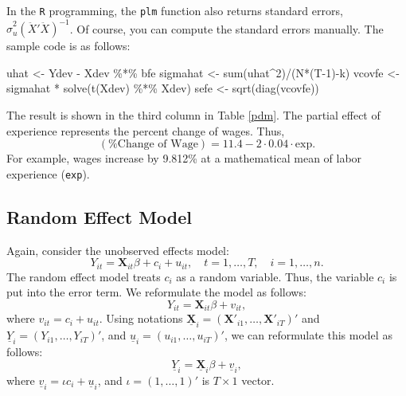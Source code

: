 \documentclass[
  12pt,
]{article}
\newenvironment{Shaded}{\begin{snugshade}}{\end{snugshade}}
\newcommand{\DecValTok}[1]{\textcolor[rgb]{0.00,0.00,0.81}{#1}}
\newcommand{\FunctionTok}[1]{\textcolor[rgb]{0.00,0.00,0.00}{#1}}
\newcommand{\NormalTok}[1]{#1}
\newcommand{\OtherTok}[1]{\textcolor[rgb]{0.56,0.35,0.01}{#1}}
\newcommand{\SpecialCharTok}[1]{\textcolor[rgb]{0.00,0.00,0.00}{#1}}
\begin{document}
In the \texttt{R} programming, the \texttt{plm} function also returns
standard errors, \(\hat{\sigma}_u^2 (\ddot{X}' \ddot{X})^{-1}\). Of
course, you can compute the standard errors manually. The sample code is
as follows:

\begin{Shaded}
\begin{Highlighting}[]
\NormalTok{uhat }\OtherTok{\textless{}{-}}\NormalTok{ Ydev }\SpecialCharTok{{-}}\NormalTok{ Xdev }\SpecialCharTok{\%*\%}\NormalTok{ bfe}
\NormalTok{sigmahat }\OtherTok{\textless{}{-}} \FunctionTok{sum}\NormalTok{(uhat}\SpecialCharTok{\^{}}\DecValTok{2}\NormalTok{)}\SpecialCharTok{/}\NormalTok{(N}\SpecialCharTok{*}\NormalTok{(T}\DecValTok{{-}1}\NormalTok{)}\SpecialCharTok{{-}}\NormalTok{k)}
\NormalTok{vcovfe }\OtherTok{\textless{}{-}}\NormalTok{ sigmahat }\SpecialCharTok{*} \FunctionTok{solve}\NormalTok{(}\FunctionTok{t}\NormalTok{(Xdev) }\SpecialCharTok{\%*\%}\NormalTok{ Xdev)}
\NormalTok{sefe }\OtherTok{\textless{}{-}} \FunctionTok{sqrt}\NormalTok{(}\FunctionTok{diag}\NormalTok{(vcovfe))}
\end{Highlighting}
\end{Shaded}

The result is shown in the third column in Table \ref{pdm}. The partial
effect of experience represents the percent change of wages. Thus, \[
  (\text{\% Change of Wage}) = 11.4 - 2 \cdot 0.04 \cdot \text{exp}.
\] For example, wages increase by 9.812\% at a mathematical mean of
labor experience (\texttt{exp}).

\hypertarget{random-effect-model}{%
\subsection{Random Effect Model}\label{random-effect-model}}

Again, consider the unobserved effects model: \[
  Y_{it} = \mathbf{X}_{it} \beta + c_i + u_{it}, \quad t = 1, \ldots, T, \quad i = 1, \ldots, n.
\] The random effect model treats \(c_i\) as a random variable. Thus,
the variable \(c_i\) is put into the error term. We reformulate the
model as follows: \[
  Y_{it} = \mathbf{X}_{it} \beta + v_{it},
\] where \(v_{it} = c_i + u_{it}\). Using notations
\(\underline{\mathbf{X}}_i = (\mathbf{X}'_{i1}, \ldots, \mathbf{X}'_{iT})'\)
and \(\underline{Y}_i = (Y_{i1}, \ldots, Y_{iT})'\), and
\(\underline{u}_i = (u_{i1}, \ldots, u_{iT})'\), we can reformulate this
model as follows: \[
  \underline{Y}_i = \underline{\mathbf{X}}_i \beta + \underline{v}_i,
\] where \(\underline{v}_i = \iota c_i + \underline{u}_i\), and
\(\iota = (1, \ldots, 1)'\) is \(T \times 1\) vector.
\end{document}
